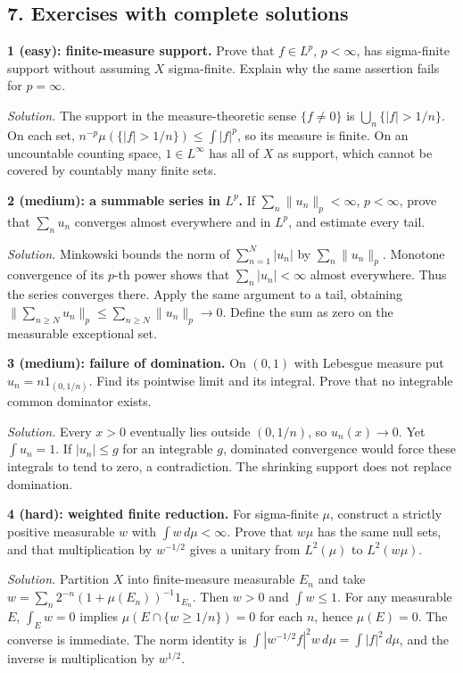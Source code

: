 \documentclass[
  english,
  11pt,
  a4paper,
]{article}
\begin{document}
\subsection{7. Exercises with complete
solutions}\label{measure-and-hilbert-space-tools--7-exercises-with-complete-solutions}

\textbf{1 (easy): finite-measure support.} Prove that \(f\in L^p\),
\(p<\infty\), has sigma-finite support without assuming \(X\)
sigma-finite. Explain why the same assertion fails for \(p=\infty\).

\emph{Solution.} The support in the measure-theoretic sense
\(\{f\ne0\}\) is \(\bigcup_n\{|f|>1/n\}\). On each set,
\(n^{-p}\mu(\{|f|>1/n\})\leq\int|f|^p\), so its measure is finite. On an
uncountable counting space, \(1\in L^\infty\) has all of \(X\) as
support, which cannot be covered by countably many finite sets.

\textbf{2 (medium): a summable series in \(L^p\).} If
\(\sum_n\|u_n\|_p<\infty\), \(p<\infty\), prove that \(\sum_nu_n\)
converges almost everywhere and in \(L^p\), and estimate every tail.

\emph{Solution.} Minkowski bounds the norm of \(\sum_{n=1}^N|u_n|\) by
\(\sum_n\|u_n\|_p\). Monotone convergence of its \(p\)-th power shows
that \(\sum_n|u_n|<\infty\) almost everywhere. Thus the series converges
there. Apply the same argument to a tail, obtaining
\(\|\sum_{n\geq N}u_n\|_p\leq\sum_{n\geq N}\|u_n\|_p\to0\). Define the
sum as zero on the measurable exceptional set.

\textbf{3 (medium): failure of domination.} On \((0,1)\) with Lebesgue
measure put \(u_n=n1_{(0,1/n)}\). Find its pointwise limit and its
integral. Prove that no integrable common dominator exists.

\emph{Solution.} Every \(x>0\) eventually lies outside \((0,1/n)\), so
\(u_n(x)\to0\). Yet \(\int u_n=1\). If \(|u_n|\leq g\) for an integrable
\(g\), dominated convergence would force these integrals to tend to
zero, a contradiction. The shrinking support does not replace
domination.

\textbf{4 (hard): weighted finite reduction.} For sigma-finite \(\mu\),
construct a strictly positive measurable \(w\) with
\(\int w\,d\mu<\infty\). Prove that \(w\mu\) has the same null sets, and
that multiplication by \(w^{-1/2}\) gives a unitary from \(L^2(\mu)\) to
\(L^2(w\mu)\).

\emph{Solution.} Partition \(X\) into finite-measure measurable \(E_n\)
and take \(w=\sum_n2^{-n}(1+\mu(E_n))^{-1}1_{E_n}\). Then \(w>0\) and
\(\int w\leq1\). For any measurable \(E\), \(\int_Ew=0\) implies
\(\mu(E\cap\{w\geq1/n\})=0\) for each \(n\), hence \(\mu(E)=0\). The
converse is immediate. The norm identity is
\(\int|w^{-1/2}f|^2w\,d\mu=\int|f|^2\,d\mu\), and the inverse is
multiplication by \(w^{1/2}\).
\end{document}
